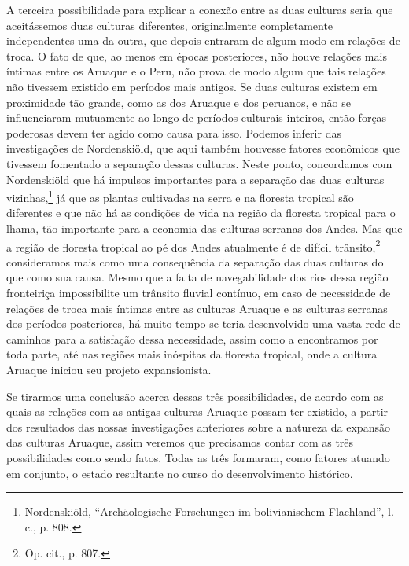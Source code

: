 A terceira possibilidade para explicar a conexão entre as duas culturas
seria que aceitássemos duas culturas diferentes, originalmente
completamente independentes uma da outra, que depois entraram de algum
modo em relações de troca. O fato de que, ao menos em épocas
posteriores, não houve relações mais íntimas entre os Aruaque e o Peru,
não prova de modo algum que tais relações não tivessem existido em
períodos mais antigos. Se duas culturas existem em proximidade tão
grande, como as dos Aruaque e dos peruanos, e não se influenciaram
mutuamente ao longo de períodos culturais inteiros, então forças
poderosas devem ter agido como causa para isso. Podemos inferir das
investigações de Nordenskiöld, que aqui também houvesse fatores
econômicos que tivessem fomentado a separação dessas culturas. Neste
ponto, concordamos com Nordenskiöld que há impulsos importantes para a
separação das duas culturas vizinhas,\footnote{Nordenskiöld,
  ``Archäologische Forschungen im bolivianischem Flachland'', l. c., p.
  808.} já que as plantas cultivadas na serra e na floresta tropical
são diferentes e que não há as condições de vida na região da floresta
tropical para o lhama, tão importante para a economia das culturas
serranas dos Andes. Mas que a região de floresta tropical ao pé dos
Andes atualmente é de difícil trânsito,\footnote{Op. cit., p. 807.}
consideramos mais como uma consequência da separação das duas culturas
do que como sua causa. Mesmo que a falta de navegabilidade dos rios
dessa região fronteiriça impossibilite um trânsito fluvial contínuo, em
caso de necessidade de relações de troca mais íntimas entre as culturas
Aruaque e as culturas serranas dos períodos posteriores, há muito tempo
se teria desenvolvido uma vasta rede de caminhos para a satisfação dessa
necessidade, assim como a encontramos por toda parte, até nas regiões
mais inóspitas da floresta tropical, onde a cultura Aruaque iniciou seu
projeto expansionista.

Se tirarmos uma conclusão acerca dessas três possibilidades, de acordo
com as quais as relações com as antigas culturas Aruaque possam ter
existido, a partir dos resultados das nossas investigações anteriores
sobre a natureza da expansão das culturas Aruaque, assim veremos que
precisamos contar com as três possibilidades como sendo fatos. Todas as
três formaram, como fatores atuando em conjunto, o estado resultante no
curso do desenvolvimento histórico.

